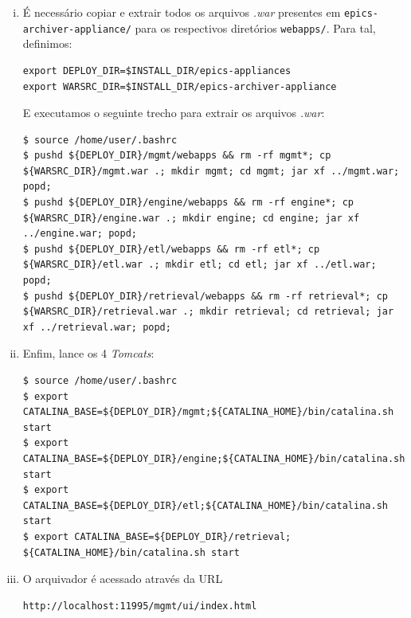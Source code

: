 \begin {enumerate}[i.]
Note que modificamos os campos \texttt{username}, \texttt{password} e
\texttt{url} de acordo com a instalação no item \ref{mysql-install}.

\item É necessário copiar e extrair todos os arquivos \textit{.war} presentes em
\texttt{epics-archiver-appliance/} para os respectivos diretórios
\texttt{webapps/}. Para tal, definimos:

\begin{lstlisting}[keywordstyle=\ttfamily, style=nonumbers]
export DEPLOY_DIR=$INSTALL_DIR/epics-appliances
export WARSRC_DIR=$INSTALL_DIR/epics-archiver-appliance
\end{lstlisting}

E executamos o seguinte trecho para extrair os arquivos \textit{.war}:

\begin{lstlisting}[basicstyle=\fontsize{9}{13}\selectfont\ttfamily,keywordstyle=\ttfamily,
style=nonumbers] 
$ source /home/user/.bashrc
$ pushd ${DEPLOY_DIR}/mgmt/webapps && rm -rf mgmt*; cp ${WARSRC_DIR}/mgmt.war .; mkdir mgmt; cd mgmt; jar xf ../mgmt.war; popd; 
$ pushd ${DEPLOY_DIR}/engine/webapps && rm -rf engine*; cp ${WARSRC_DIR}/engine.war .; mkdir engine; cd engine; jar xf ../engine.war; popd; 
$ pushd ${DEPLOY_DIR}/etl/webapps && rm -rf etl*; cp ${WARSRC_DIR}/etl.war .; mkdir etl; cd etl; jar xf ../etl.war; popd; 
$ pushd ${DEPLOY_DIR}/retrieval/webapps && rm -rf retrieval*; cp ${WARSRC_DIR}/retrieval.war .; mkdir retrieval; cd retrieval; jar xf ../retrieval.war; popd;
\end{lstlisting}

\item Enfim, lance os 4 \textit{Tomcats}:

\begin{lstlisting}[basicstyle=\fontsize{9}{13}\selectfont\ttfamily,keywordstyle=\ttfamily,
style=nonumbers]
$ source /home/user/.bashrc
$ export CATALINA_BASE=${DEPLOY_DIR}/mgmt;${CATALINA_HOME}/bin/catalina.sh start 
$ export CATALINA_BASE=${DEPLOY_DIR}/engine;${CATALINA_HOME}/bin/catalina.sh start 
$ export CATALINA_BASE=${DEPLOY_DIR}/etl;${CATALINA_HOME}/bin/catalina.sh start 
$ export CATALINA_BASE=${DEPLOY_DIR}/retrieval; ${CATALINA_HOME}/bin/catalina.sh start

\end{lstlisting}

\item O arquivador é acessado através da URL 

\begin{lstlisting}[keywordstyle=\ttfamily, style=nonumbers]
http://localhost:11995/mgmt/ui/index.html
\end{lstlisting}

\end{enumerate} 

